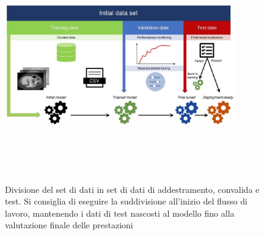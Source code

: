 \documentclass[12pt,a4paper]{report}
\begin{document}
\begin{figure}[h!]
    \begin{center}
        \includegraphics[width=10cm,height=10cm,keepaspectratio]{Data_radiology}
    \end{center}
    \caption{Divisione del set di dati in set di dati di addestramento, convalida e test. Si consiglia di eseguire la suddivisione all'inizio del flusso di lavoro, mantenendo i dati di test nascosti al modello fino alla valutazione finale delle prestazioni}
    \label{fig:data-sampling-radiology}
\end{figure}
\end{document}
